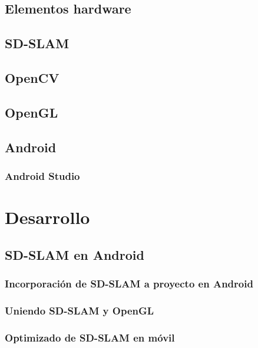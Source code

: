 \documentclass[a4paper, 12pt]{book}
\begin{document}
\section{Elementos hardware}
\label{sec:elementoshardware}

\section{SD-SLAM}
\label{sec:sdslam}

\section{OpenCV}
\label{sec:opencv}

\section{OpenGL}
\label{sec:opengl}

\section{Android}
\label{sec:android}

\subsection{Android Studio}
\label{subsec:androidstudio}

\chapter{Desarrollo}
\label{sec:desarrollo}

\section{SD-SLAM en Android}
\label{sec:sdslamenandroid}

\subsection{Incorporación de SD-SLAM a proyecto en Android}
\label{subsec:sdslamincorporadoandroid}

\subsection{Uniendo SD-SLAM y OpenGL}
\label{subsec:sdslamyopengl}

\subsection{Optimizado de SD-SLAM en móvil}
\label{subsec:opmizacionsdslammovil}
\end{document}
